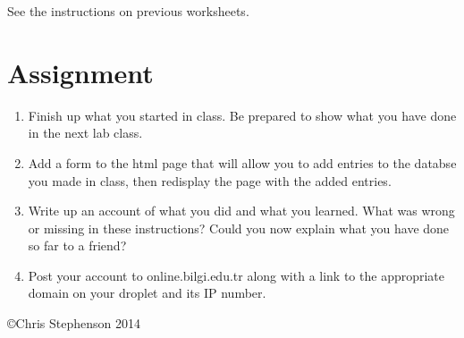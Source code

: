 \documentclass[12pt, a4paper]{article}
\begin{document}
See the instructions on previous worksheets.


\section*{Assignment}

\begin{enumerate}
\item Finish up what you started in class. Be prepared to show what you have done in the next lab class.
\item Add a form to the html page that will allow you to add entries to the databse you made in class, then redisplay the page with the added entries.
\item Write up an account of what you did and what you learned. What was wrong or missing in these instructions? Could you now explain what you have done so far to a friend?
\item Post your account to online.bilgi.edu.tr along with a link to the appropriate domain on your droplet and its IP number.

\end{enumerate}

\copyright Chris Stephenson 2014
\end{document}
